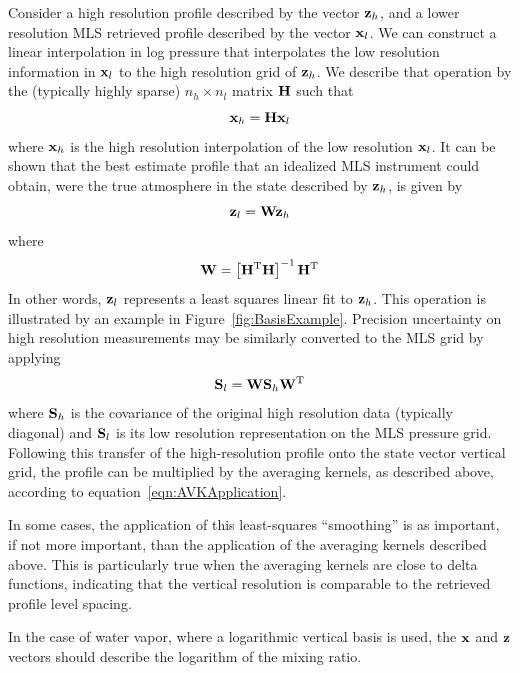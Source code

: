 \documentclass[11pt,draft]{report}
\begin{document}
Consider a high resolution profile described by the vector $\mathbf{z}_h$,
and a lower resolution MLS retrieved profile described by the vector
$\mathbf{x}_l$.  We can construct a linear interpolation in log pressure that
interpolates the low resolution information in $\mathbf{x}_l$ to the high
resolution grid of $\mathbf{z}_h$.  We describe that operation by the
(typically highly sparse) $n_h \times n_l$ matrix $\mathbf{H}$ such that
\begin{equation}
\mathbf{x}_h = \mathbf{H}\mathbf{x}_l
\label{eqn:EtaForward}
\end{equation}
where $\mathbf{x}_h$ is the high resolution interpolation of the low
resolution $\mathbf{x}_l$.  It can be shown that the best estimate profile
that an idealized MLS instrument could obtain, were the true atmosphere
in the state described by $\mathbf{z}_h$, is given by
\begin{equation}
\mathbf{z}_l = \mathbf{W}\mathbf{z}_h
\label{eqn:EtaBackward}
\end{equation}
where
\begin{equation}
\mathbf{W} = \left[ \mathbf{H}^{\text{T}} \mathbf{H} \right]^{\mathrm -1} \mathbf{H}^{\text{T}}
\end{equation}
In other words, $\mathbf{z}_l$ represents a least squares linear fit to
$\mathbf{z}_h$. This operation is illustrated by an example in
Figure~\ref{fig:BasisExample}.  Precision uncertainty on high resolution
measurements may be similarly converted to the MLS grid by applying
\begin{equation}
\mathbf{S}_l = \mathbf{W} \mathbf{S}_h \mathbf{W}^{\text{T}}
\end{equation}
where $\mathbf{S}_h$ is the covariance of the original high resolution data
(typically diagonal) and $\mathbf{S}_l$ is its low resolution representation
on the MLS pressure grid.  Following this transfer of the
high-resolution profile onto the state vector vertical grid, the profile
can be multiplied by the averaging kernels, as described above,
according to equation~\ref{eqn:AVKApplication}.

In some cases, the application of this least-squares ``smoothing'' is as
important, if not more important, than the application of the averaging
kernels described above.  This is particularly true when the averaging
kernels are close to delta functions, indicating that the vertical
resolution is comparable to the retrieved profile level spacing.

In the case of water vapor, where a logarithmic vertical basis is used,
the $\mathbf{x}$ and $\mathbf{z}$ vectors should describe the logarithm of the
mixing ratio.
\end{document}

